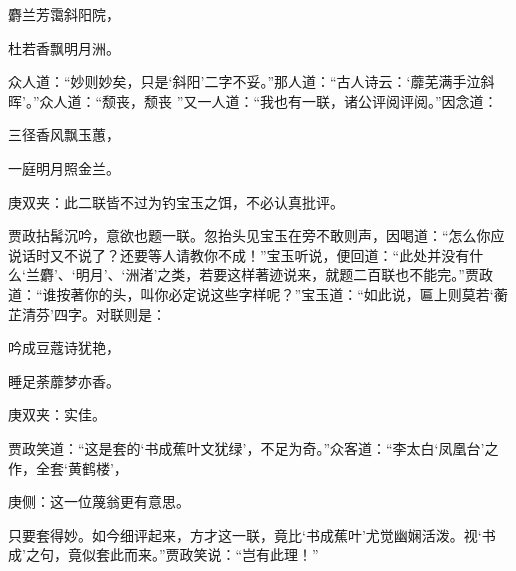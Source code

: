 \begin{poem}
    \begin{pl}    麝兰芳霭斜阳院，\end{pl}

    \begin{pl}    杜若香飘明月洲。\end{pl}
\end{poem}


\begin{parag}
    众人道：“妙则妙矣，只是‘斜阳’二字不妥。”那人道：“古人诗云：‘蘼芜满手泣斜晖’。”众人道：“颓丧，颓丧 ”又一人道：“我也有一联，诸公评阅评阅。”因念道：
\end{parag}


\begin{poem}
    \begin{pl}三径香风飘玉蕙，\end{pl}

    \begin{pl}一庭明月照金兰。\end{pl}
    \begin{note}庚双夹：此二联皆不过为钓宝玉之饵，不必认真批评。\end{note}
\end{poem}


\begin{parag}
    贾政拈髯沉吟，意欲也题一联。忽抬头见宝玉在旁不敢则声，因喝道：“怎么你应说话时又不说了？还要等人请教你不成！”宝玉听说，便回道：“此处并没有什么‘兰麝’、‘明月’、‘洲渚’之类，若要这样著迹说来，就题二百联也不能完。”贾政道：“谁按著你的头，叫你必定说这些字样呢？”宝玉道：“如此说，匾上则莫若‘蘅芷清芬’四字。对联则是：
\end{parag}


\begin{poem}
    \begin{pl}吟成豆蔻诗犹艳，\end{pl}
    \begin{pl}睡足荼蘼梦亦香。\end{pl}\begin{note}庚双夹：实佳。\end{note}
\end{poem}


\begin{parag}
    贾政笑道：“这是套的‘书成蕉叶文犹绿’，不足为奇。”众客道：“李太白‘凤凰台’之作，全套‘黄鹤楼’，\begin{note}庚侧：这一位蔑翁更有意思。\end{note}只要套得妙。如今细评起来，方才这一联，竟比‘书成蕉叶’尤觉幽娴活泼。视‘书成’之句，竟似套此而来。”贾政笑说：“岂有此理！”
\end{parag}


